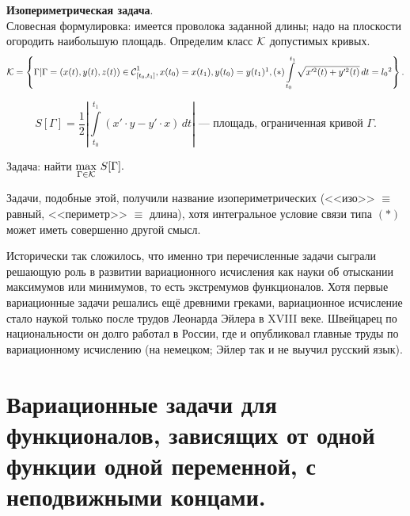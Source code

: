 \begin{enumerate2}
	\item \textbf{Изопериметрическая задача}.\\
	Словесная формулировка: имеется проволока заданной длины; надо на плоскости огородить наибольшую площадь. Определим класс $\mathcal{K}$ допустимых кривых.
	\label{l1:eq:Isoperimetr} 
	\begin{equation*}
		\mc{K}=\left\{\Gamma|\Gamma=(x(t),y(t),z(t))\in\Cfn[{[t_0,t_1]}]{1}, x(t_0)=x(t_1), y(t_0)=y(t_1)\footnotemark{}, (*)\int\limits_{t_0}^{t_1}\sqrt{x^{\prime 2}(t)+y^{\prime 2}(t)}\,dt=l_0\footnotemark{}\right\}.
	\end{equation*}
	\addtocounter{footnote}{-1}\addtocounter{footnote}{1}
	\begin{equation*}
		S[\Gamma]=\frac12\left|\int\limits_{t_0}^{t_1}\left(x'\cdot y-y'\cdot x\right)\,dt\right|\text{ --- площадь, ограниченная кривой }\Gamma.
	\end{equation*}
	
	Задача: найти $\max\limits_{\Gamma\in\mathcal{K}}\,S[\Gamma].$
	
	Задачи, подобные этой, получили название изопериметрических (<<изо>> $\equiv$ равный,  <<периметр>> $\equiv$ длина), хотя интегральное условие связи типа $(\hyperref[l1:eq:Isoperimetr]{*})$ может иметь совершенно другой смысл.
\end{enumerate2}

Исторически так сложилось, что именно три перечисленные задачи сыграли решающую роль в развитии вариационного исчисления как науки об отыскании максимумов или минимумов, то есть экстремумов функционалов. Хотя первые вариационные задачи решались ещё древними греками, вариационное исчисление стало наукой только после трудов Леонарда Эйлера в XVIII веке. Швейцарец по национальности он долго работал в России, где и опубликовал главные труды по вариационному исчислению (на немецком; Эйлер так и не выучил русский язык). 

\section[Задачи с неподвижными концами.]{Вариационные задачи для функционалов, зависящих от одной функции одной переменной, с неподвижными концами.}
\label{lecture1section2}

